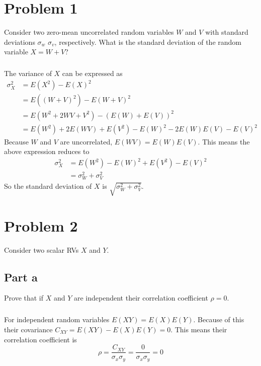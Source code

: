 \documentclass[11pt]{article}
\begin{document}
\thispagestyle{empty}

\newlength{\boxlength}\setlength{\boxlength}{\textwidth}
\addtolength{\boxlength}{-4mm}

\begin{center}
\end{center}

\section*{Problem 1}
Consider two zero-mean uncorrelated random variables $W$ and $V$ with standard deviations $\sigma_w$ $\sigma_v$, respectively. What is the standard deviation of the random variable $X=W+V$?

\subparagraph*{}
The variance of $X$ can be expressed as
\begin{align*}
	\sigma_X^2 &= E(X^2)-E(X)^2 \\
	&= E((W+V)^2)-E(W+V)^2 \\
	&= E(W^2 + 2WV + V^2) - (E(W)+E(V))^2 \\
	&= E(W^2) + 2E(WV) + E(V^2) - E(W)^2 - 2E(W)E(V) - E(V)^2
\end{align*}
Because $W$ and $V$ are uncorrelated, $E(WV)=E(W)E(V)$. This means the above expression reduces to
\begin{align*}
	\sigma_X^2 &= E(W^2)-E(W)^2 + E(V^2) - E(V)^2 \\
	&= \sigma_W^2 + \sigma_V^2
\end{align*}
So the standard deviation of $X$ is $\sqrt{\sigma_W^2+\sigma_V^2}$.

\section*{Problem 2}
Consider two scalar RVs $X$ and $Y$.

\subsection*{Part a}
Prove that if $X$ and $Y$ are independent their correlation coefficient $\rho=0$.

\subparagraph*{}
For independent random variables $E(XY)=E(X)E(Y)$. Because of this their covariance $C_{XY}=E(XY)-E(X)E(Y)=0$. This means their correlation coefficient is
\begin{equation*}
	\rho = \frac{C_{XY}}{\sigma_x \sigma_y} = \frac{0}{\sigma_x \sigma_y} = 0
\end{equation*}
\end{document}
